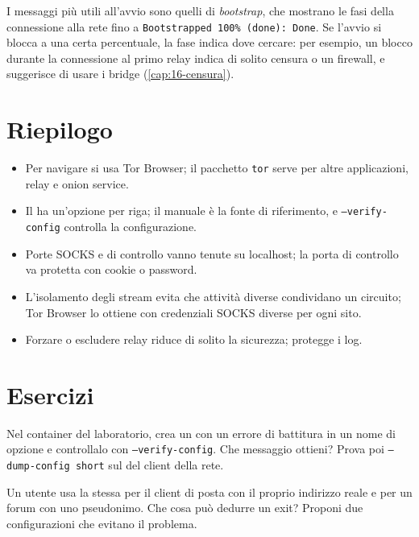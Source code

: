 I messaggi più utili all'avvio sono quelli di \emph{bootstrap}, che mostrano le fasi della connessione alla rete fino a \texttt{Bootstrapped 100\% (done): Done}. Se l'avvio si blocca a una certa percentuale, la fase indica dove cercare: per esempio, un blocco durante la connessione al primo relay indica di solito censura o un firewall, e suggerisce di usare i bridge (\cref{cap:16-censura}).

\section*{Riepilogo}
\begin{itemize}
  \item Per navigare si usa Tor Browser; il pacchetto \texttt{tor} serve per altre applicazioni, relay e onion service.
  \item Il  ha un'opzione per riga; il manuale è la fonte di riferimento, e \texttt{--verify-config} controlla la configurazione.
  \item Porte SOCKS e di controllo vanno tenute su localhost; la porta di controllo va protetta con cookie o password.
  \item L'isolamento degli stream evita che attività diverse condividano un circuito; Tor Browser lo ottiene con credenziali SOCKS diverse per ogni sito.
  \item Forzare o escludere relay riduce di solito la sicurezza;  protegge i log.
\end{itemize}

\section*{Esercizi}

\begin{esercizio}[1]\label{es:17-verifica}
Nel container del laboratorio, crea un  con un errore di battitura in un nome di opzione e controllalo con \texttt{--verify-config}. Che messaggio ottieni? Prova poi \texttt{--dump-config short} sul  del client della rete.
\end{esercizio}

\begin{esercizio}[2]\label{es:17-isolamento}
Un utente usa la stessa  per il client di posta con il proprio indirizzo reale e per un forum con uno pseudonimo. Che cosa può dedurre un exit? Proponi due configurazioni che evitano il problema.
\end{esercizio}

